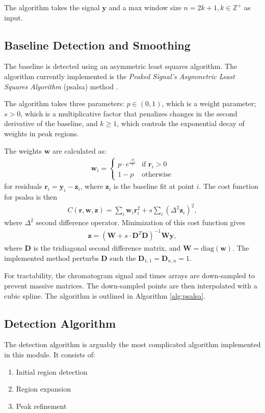 \documentclass{article}
\begin{document}
The algorithm takes the signal $\bm{y}$ and a max window size $n = 2k+1, k \in \mathbb{Z}^+$ as input. 

\subsection{Baseline Detection and Smoothing}\label{sec:psalsa}
The baseline is detected using an asymmetric least squares algorithm. The algorithm currently implemented is the \textit{Peaked Signal's Asymmetric
Least Squares Algorithm} (psalsa) method \cite{psalsa}.

The algorithm takes three parameters: $p \in (0,1)$, which is a weight parameter; $s > 0$, which is a multiplicative factor that penalizes changes in the second derivative of the baseline, and $k\geq 1$, which controls the exponential decay of weights in peak regions. 

The weights $\bm{w}$ are calculated as:
\begin{align}
\bm{w}_i = \begin{cases}
	p \cdot e^{\frac{-\bm{r}_i}{k}} & \text{if } \bm{r}_i > 0\\
	1-p & \text{otherwise}
\end{cases} \label{eqn:weights}
\end{align}
for residuals $\bm{r}_i = \bm{y}_i-\bm{z}_i$, where $\bm{z}_i$ is the baseline fit at point $i$. The cost function for psalsa is then
\begin{align}
C(\bm{r},\bm{w},\bm{z}) = \sum_i \bm{w}_i \bm{r}_i^2 + s \sum_i (\Delta^2 \bm{z}_i)^2,
\end{align}
where $\Delta^2$ second difference operator. Minimization of this cost function gives 
\begin{align}
\bm{z} = (\mathbf{W} + s \cdot \mathbf{D}^T\mathbf{D})^{-1}\mathbf{W}\bm{y},
\end{align}
where $\mathbf{D}$ is the tridiagonal second difference matrix, and $\mathbf{W} = \text{diag}(\bm{w})$. The implemented method perturbs $\mathbf{D}$ such the $\mathbf{D}_{1,1} = \mathbf{D}_{n,n} = 1$. 

For tractability, the chromatogram signal and times arrays are down-sampled to prevent massive matrices. The down-sampled points are then interpolated with a cubic spline. The algorithm is outlined in Algorithm \ref{alg:psalsa}.

\subsection{Detection Algorithm}\label{sec:detectionalg}
The detection algorithm is arguably the most complicated algorithm implemented in this module. It consists of:
\begin{enumerate}
\item Initial region detection
\item Region expansion
\item Peak refinement
\end{enumerate}
\end{document}
